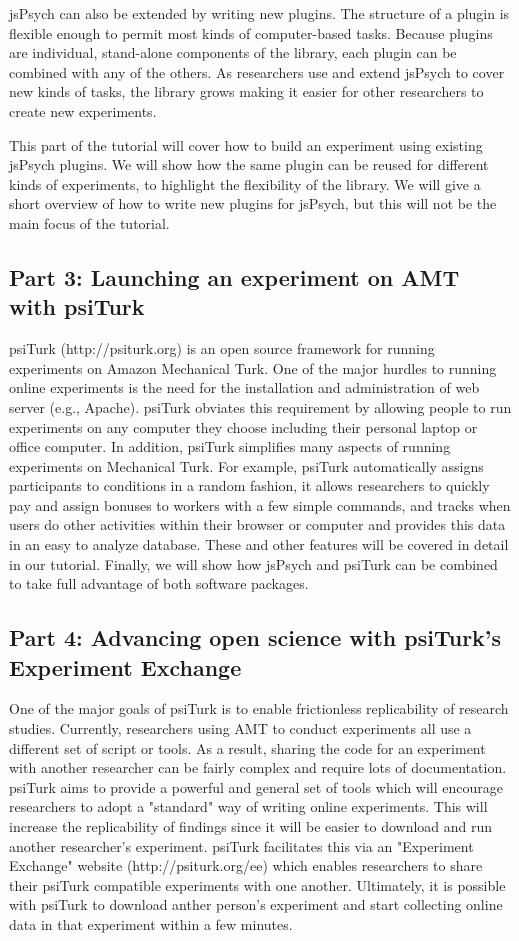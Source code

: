 \documentclass[10pt,letterpaper]{article}
\begin{document}
jsPsych can also be extended by writing new plugins. The structure of a plugin is flexible enough to permit most kinds of computer-based tasks. Because plugins are individual, stand-alone components of the library, each plugin can be combined with any of the others. As researchers use and extend jsPsych to cover new kinds of tasks, the library grows making it easier for other researchers to create new experiments.

This part of the tutorial will cover how to build an experiment using existing jsPsych plugins. We will show how the same plugin can be reused for different kinds of experiments, to highlight the flexibility of the library. We will give a short overview of how to write new plugins for jsPsych, but this will not be the main focus of the tutorial.

\subsection{Part 3: Launching an experiment on AMT with psiTurk}

psiTurk (http://psiturk.org) is an open source framework for running experiments on Amazon Mechanical Turk.  One of the major hurdles to running online experiments
is the need for the installation and administration of web server (e.g., Apache).  psiTurk obviates this requirement by allowing people to run experiments
on any computer they choose including their personal laptop or office computer.  In addition, psiTurk simplifies many aspects of running experiments
on Mechanical Turk.  For example, psiTurk automatically assigns participants to conditions in a random fashion, it allows researchers to quickly
pay and assign bonuses to workers with a few simple commands, and tracks when users do other activities within their browser or computer
and provides this data in an easy to analyze database.   These and other features will be covered in detail in our tutorial. Finally, we will show how jsPsych and psiTurk can be combined to take full advantage of both software packages.

\subsection{Part 4: Advancing open science with psiTurk's Experiment Exchange}

One of the major goals of psiTurk is to enable frictionless replicability of research studies.  Currently, researchers using AMT to conduct
experiments all use a different set of script or tools.  As a result, sharing the code for an experiment with another researcher can be fairly complex
and require lots of documentation.  psiTurk aims to provide a powerful and general set of tools which will encourage researchers to adopt
a "standard" way of writing online experiments.  This will increase the replicability of findings since it will be easier to download and run
another researcher's experiment.  psiTurk facilitates this via an "Experiment Exchange" website (http://psiturk.org/ee) which enables researchers 
to share their psiTurk compatible experiments with one another.  Ultimately, it is possible with psiTurk to download anther person's experiment 
and start collecting online data in that experiment within a few minutes.
\end{document}
